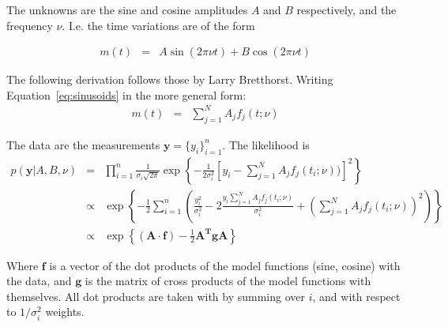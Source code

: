 \documentclass[a4paper, 10pt]{article}
\title{}
\author{Me}
\date{\today}
\begin{document}
\maketitle


The unknowns are the sine and cosine amplitudes $A$ and $B$ respectively,
and the frequency $\nu$. I.e. the time variations are of the form

\begin{eqnarray}
m(t) &=& A\sin(2\pi\nu t) + B\cos(2\pi\nu t)\label{eq:sinusoids}
\end{eqnarray}

The following derivation follows those by Larry Bretthorst. Writing
Equation~\ref{eq:sinusoids} in the more general form:
\begin{eqnarray}
m(t) &=& \sum_{j=1}^N A_j f_j(t; \nu)\label{eq:sinusoids}
\end{eqnarray}

The data are the measurements
$\mathbf{y} = \{y_i\}_{i=1}^n$.
The likelihood is
\begin{eqnarray}
p(\mathbf{y} | A, B, \nu)
&=&
\prod_{i=1}^{n} \frac{1}{\sigma_i \sqrt{2\pi}}
\exp\left\{
-\frac{1}{2\sigma_i^2}
\left[y_i - \sum_{j=1}^N A_j f_j(t_i; \nu))\right]^2
\right\}
\\
&\propto&
\exp\left\{
-\frac{1}{2}\sum_{i=1}^n
\left(
\frac{y_i^2}{\sigma_i^2} - 2\frac{y_i \sum_{j=1}^N A_j f_j(t_i; \nu)}{\sigma_i^2}
+ \left(\sum_{j=1}^N A_j f_j(t_i; \nu)\right)^2
\right)
\right\}\nonumber\\
&\propto&
\exp\left\{
(\mathbf{A}\cdot\mathbf{f})
 -\frac{1}{2} \mathbf{A^T}\mathbf{g}\mathbf{A}
\right\}
\end{eqnarray}

Where $\mathbf{f}$ is a vector of the dot products of the model functions
(sine, cosine) with the data, and $\mathbf{g}$ is the matrix of cross products
of the model functions with themselves. All dot products are taken with
by summing over $i$, and with respect to $1/\sigma_i^2$ weights.
\end{document}
